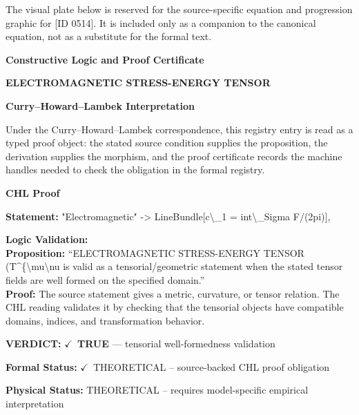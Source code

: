 \begingroup\footnotesize\sloppy
The visual plate below is reserved for the source-specific equation and progression graphic for [ID 0514]. It is included only as a companion to the canonical equation, not as a substitute for the formal text.
\par\endgroup
\ifTZPDarkEdition
{}
\fi

\clearpage
\begingroup\tzpsupportsetup
\noindent\textbf{\fontsize{10.8pt}{12.8pt}\selectfont [ID 0514] Constructive Logic and Proof Certificate}\par
\noindent\textbf{\fontsize{10pt}{12pt}\selectfont ELECTROMAGNETIC STRESS-ENERGY TENSOR}\par
\vspace{0.45em}
\begingroup
\footnotesize
\setlength{\parskip}{0.22em}
\setlength{\parindent}{0pt}
\noindent\textbf{Curry--Howard--Lambek Interpretation}\par
Under the Curry--Howard--Lambek correspondence, this registry entry is read as a typed proof
object: the stated source condition supplies the proposition, the derivation supplies the
morphism, and the proof certificate records the machine handles needed to check the obligation
in the formal registry.

\vspace{0.45em}
\noindent\textbf{CHL Proof}\par
\textbf{Statement:} "Electromagnetic" -> LineBundle[c\textbackslash{}\_1 = int\textbackslash{}\_Sigma F/(2pi)],

\textbf{Logic Validation:}\\
\textbf{Proposition:} ``ELECTROMAGNETIC STRESS-ENERGY TENSOR (T\textasciicircum{}\{\textbackslash{}mu\textbackslash{}nu is valid as a tensorial/geometric
statement when the stated tensor fields are well formed on the specified domain.''\\
\textbf{Proof:} The source statement gives a metric, curvature, or tensor relation. The CHL reading
validates it by checking that the tensorial objects have compatible domains, indices,
and transformation behavior.

\textbf{VERDICT:} \ensuremath{\checkmark}\ \textbf{TRUE} --- tensorial well-formedness validation

\textbf{Formal Status:} \ensuremath{\checkmark}\ THEORETICAL -- source-backed CHL proof obligation

\textbf{Physical Status:} THEORETICAL -- requires model-specific empirical interpretation
\par\vspace{0.45em}
\par
\ifTZPDarkEdition
{}
\fi
\endgroup
\endgroup
